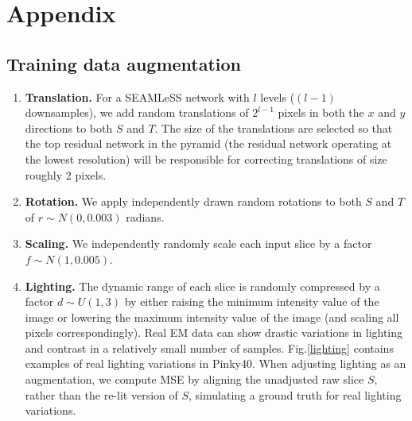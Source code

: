 \documentclass{article}
\begin{document}


\newpage

\appendix
\section{Appendix}

\subsection{Training data augmentation}\label{augmentation}
\begin{enumerate}
\item \textbf{Translation.} For a SEAMLeSS network with $l$ levels ($(l-1)$ downsamples), we add random translations of $2^{l-1}$ pixels in both the $x$ and $y$ directions to both $S$ and $T$. The size of the translations are selected so that the top residual network in the pyramid (the residual network operating at the lowest resolution) will be responsible for correcting translations of size roughly 2 pixels.
\item \textbf{Rotation.} We apply independently drawn random rotations to both $S$ and $T$ of $r\sim N(0,0.003)$ radians.
\item \textbf{Scaling.} We independently randomly scale each input slice by a factor $f\sim N(1,0.005)$.
\item \textbf{Lighting.} The dynamic range of each slice is randomly compressed by a factor $d\sim U(1,3)$ by either raising the minimum intensity value of the image or lowering the maximum intensity value of the image (and scaling all pixels correspondingly). Real EM data can show drastic variations in lighting and contrast in a relatively small number of samples. Fig.\ref{lighting} contains examples of real lighting variations in Pinky40. When adjusting lighting as an augmentation, we compute MSE by aligning the unadjusted raw slice $S$, rather than the re-lit version of $S$, simulating a ground truth for real lighting variations. 
\begin{figure}[!ht]
	\centering

\end{figure}
\end{enumerate}
\end{document}
